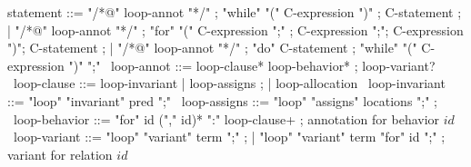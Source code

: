 \begin{syntax}
  statement ::= "/*@" loop-annot "*/" ;
  "while" "(" C-expression ")" ;
  C-statement ;
  | "/*@" loop-annot "*/" ;
  "for" "(" C-expression ";" ;
  C-expression ";";
  C-expression ")";
  C-statement ;
  | "/*@" loop-annot "*/" ;
  "do" C-statement ;
  "while" "(" C-expression ")" ";"
  \
  loop-annot ::= loop-clause* loop-behavior* ;
                 loop-variant?
  \
  loop-clause ::= loop-invariant | loop-assigns ;
                | loop-allocation
  \
  loop-invariant ::= "loop" "invariant" pred ";" 
  \
  loop-assigns ::= "loop" 
                   "assigns" locations ";" ;
  \
  loop-behavior ::= "for" id ("," id)* ":" loop-clause+ ; annotation for behavior $id$
  \
  loop-variant ::= "loop" "variant" term ";" ;
  | "loop" "variant" term "for" id ";" ; variant for relation $id$
\end{syntax}
